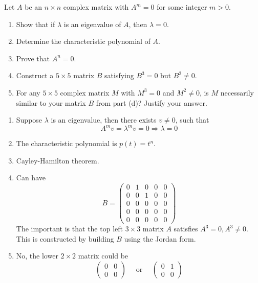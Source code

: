 \begin{prob}[F2001-Q3]
    Let \( A \) be an \( n \times n \) complex matrix with \( A^m = 0 \) for some integer \( m > 0 \).
    
    \begin{enumerate}
        \item Show that if \( \lambda \) is an eigenvalue of \( A \), then \( \lambda = 0 \).
        
        \item Determine the characteristic polynomial of \( A \).
        
        \item Prove that \( A^n = 0 \).
        
        \item Construct a \( 5 \times 5 \) matrix \( B \) satisfying \( B^3 = 0 \) but \( B^2 \neq 0 \).
        
        \item For any \( 5 \times 5 \) complex matrix \( M \) with \( M^3 = 0 \) and \( M^2 \neq 0 \), is \( M \) necessarily similar to your matrix \( B \) from part (d)? Justify your answer.
    \end{enumerate}
\end{prob}
\begin{enumerate}
    \item Suppose $\lambda$ is an eigenvalue, then there exists $v\neq 0$, such that 
    \begin{equation*}
        A^mv=\lambda^mv=0\Rightarrow \lambda=0
    \end{equation*}
    \item The characteristic polynomial is $p(t)=t^n$.
    \item Cayley-Hamilton theorem.
    \item Can have 
    \begin{equation*}
        B=\begin{pmatrix}
            0&1&0&0&0\\
            0&0&1&0&0\\
            0&0&0&0&0\\
            0&0&0&0&0\\
            0&0&0&0&0
        \end{pmatrix}
    \end{equation*}
    The important is that the top left $3\times 3$ matrix $A$ satisfies $A^3=0, A^3\neq 0$. This is constructed by building $B$ using the Jordan form.
    \item No, the lower $2\times 2$ matrix could be 
    \begin{equation*}
        \begin{pmatrix}
            0&0\\
            0&0
        \end{pmatrix}\quad \text{ or }\quad \begin{pmatrix}
            0&1\\
            0&0
        \end{pmatrix}
    \end{equation*}
\end{enumerate}


